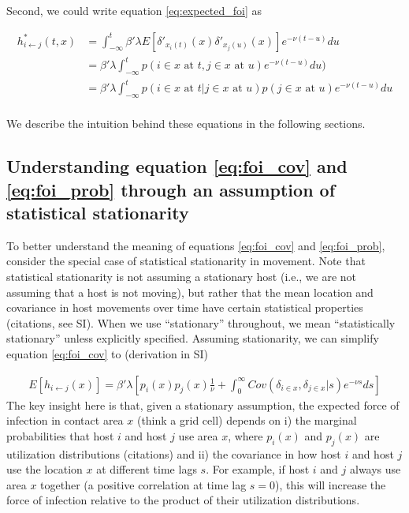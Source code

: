 \documentclass[letterpaper]{article}
\begin{document}
Second, we could write equation \ref{eq:expected_foi} as 

\begin{equation}
    \begin{aligned}
    h^*_{i \leftarrow j}(t, x) &= \int_{-\infty}^{t} \beta' \lambda E[\delta'_{x_i(t)}(x) \delta'_{x_j(u)}(x)] e^{-\nu(t - u)} du \\
    &= \beta' \lambda \int_{-\infty}^{t} p(i \in x \text{ at } t, j \in x \text{ at } u) e^{-\nu(t - u)} du) \\
    &= \beta' \lambda \int_{-\infty}^{t} p(i \in x \text{ at } t | j \in x \text{ at } u) p(j \in x \text{ at } u) e^{-\nu(t - u)} du \\
    \end{aligned}
    \label{eq:foi_prob}
\end{equation}

We describe the intuition behind these equations in the following sections.

\subsection*{Understanding equation \ref{eq:foi_cov} and \ref{eq:foi_prob} through an assumption of statistical stationarity}

To better understand the meaning of equations \ref{eq:foi_cov} and \ref{eq:foi_prob}, consider the special case of statistical stationarity in movement. Note that statistical stationarity is not assuming a stationary host (i.e., we are not assuming that a host is not moving), but rather that the mean location and covariance in host movements over time have certain statistical properties (citations, see SI). When we use ``stationary'' throughout, we mean ``statistically stationary'' unless explicitly specified.  Assuming stationarity, we can simplify equation \ref{eq:foi_cov} to (derivation in SI)

\begin{equation}
    \begin{aligned}
    E[h_{i \leftarrow j}(x)] = \beta' \lambda [p_i(x)p_j(x) \frac{1}{\nu} + \int_{0}^{\infty} Cov(\delta_{i \in x}, \delta_{j \in x} | s) e^{-\nu s} ds]
    \end{aligned}
    \label{eq:foi_stationary}
\end{equation}
The key insight here is that, given a stationary assumption, the expected force of infection in contact area $x$ (think a grid cell) depends on i) the marginal probabilities that host $i$ and host $j$ use area $x$, where $p_i(x)$ and $p_j(x)$ are utilization distributions (citations) and ii) the covariance in how host $i$ and host $j$ use the location $x$ at different time lags $s$. For example, if host $i$ and $j$ always use area $x$ together (a positive correlation at time lag $s = 0$), this will increase the force of infection relative to the product of their utilization distributions.
\end{document}
